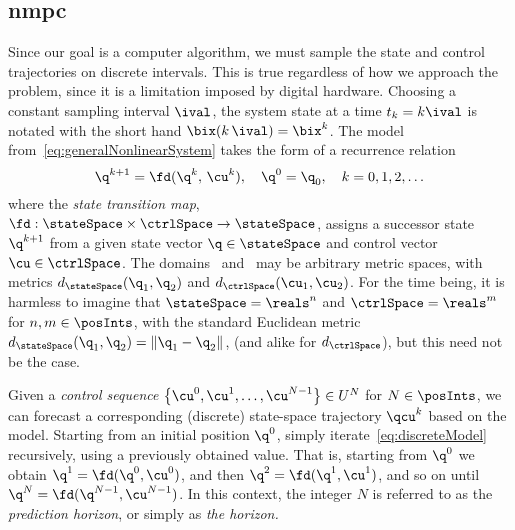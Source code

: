 \subsection{\acl{nmpc}}


Since our goal is a computer algorithm, we must sample the state and control
trajectories on discrete intervals. This is true
regardless of how we approach the problem, since it is a limitation imposed by
digital hardware. Choosing a constant sampling interval $\ival$, the system
state at a time $t_k = k\ival$ is notated with the short hand $\bix(k\,\ival) =
\bix^k$. The model from~\eqref{eq:generalNonlinearSystem} takes the form of a
recurrence relation
%
\begin{equation}\label{eq:discreteModel}
  \q^{k+1} = \fd(\q^k,\, \cu^k),\quad\q^0 = \q_0,\quad k = 0,1,2,\ldots
\end{equation}
%
where the \emph{state transition map},
$\fd:\stateSpace\times\ctrlSpace\rightarrow\stateSpace$, assigns a successor
state $\q^{k+1}$ from a given state vector $\q\in\stateSpace$ and control vector
$\cu\in\ctrlSpace$. The domains \stateSpace\ and \ctrlSpace\ may be arbitrary
metric spaces, with metrics $d_\stateSpace(\q_1, \q_2)$ and $d_\ctrlSpace(\cu_1,
\cu_2)$. For the time being, it is harmless to imagine that $\stateSpace =
\reals^n$ and $\ctrlSpace = \reals^m$ for $n,m \in \posInts$, with the standard
Euclidean metric $d_\stateSpace(\q_1, \q_2) = \norm{\q_1 - \q_2}$, (and alike
for $d_\ctrlSpace$), but this need not be the case.

Given a \emph{control sequence}
$\bigl\{\cu^0,\cu^1,\ldots,\cu^{N-1}\bigr\} \in U^{N}$ for $N\in\posInts$, we
can forecast a corresponding (discrete) state-space trajectory $\qcu^k$ based on
the model. Starting from an initial position $\q^0$, simply
iterate~\eqref{eq:discreteModel} recursively, using a previously obtained value.
That is, starting from $\q^0$ we obtain $\q^1 = \fd(\q^0, \cu^0)$, and then
$\q^2 = \fd(\q^1, \cu^1)$, and so on until $\q^N = \fd(\q^{N-1}, \cu^{N-1})$. In
this context, the integer $N$ is referred to as the \emph{prediction
horizon}, or simply as \emph{the horizon.}

